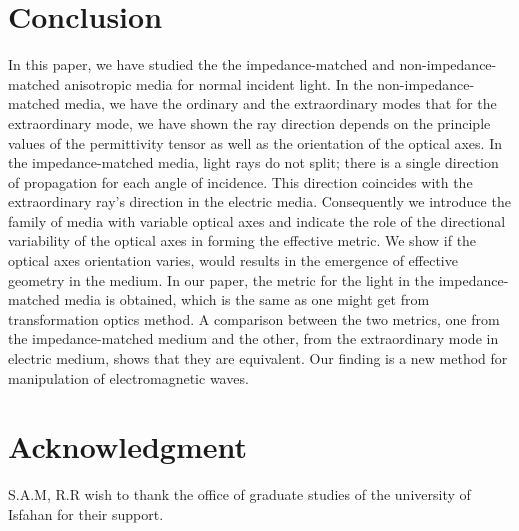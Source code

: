 \documentclass[9pt,twocolumn,twoside]{osajnl}
\begin{document}
\section{Conclusion}\label{conclusion}

In this paper, we have studied the  the impedance-matched and non-impedance-matched anisotropic media for normal incident light.  In the non-impedance-matched media, we have the ordinary and the extraordinary modes that for the extraordinary mode, we have shown the ray direction depends on the principle values of the permittivity tensor as well as the orientation of the optical axes. In the impedance-matched media, light rays do not split; there is a single direction of propagation for each angle of incidence. This direction coincides with the extraordinary ray's direction in the electric media. 
 Consequently we  introduce the family of media with variable optical axes and indicate the role of the directional variability of the optical axes in forming the effective metric. We show if the optical axes orientation varies, would results in the emergence of effective geometry in the medium. In our paper, the metric for the light in the impedance-matched media is obtained, which is the same as one might get from transformation optics method.   A comparison between the two metrics, one from the impedance-matched medium and the other, from the extraordinary mode in electric medium, shows that they are equivalent.  Our finding is a new method for manipulation of electromagnetic waves.
 


\section*{Acknowledgment}
S.A.M, R.R wish to thank the office of graduate studies of the university of Isfahan for their support.


\end{document}
